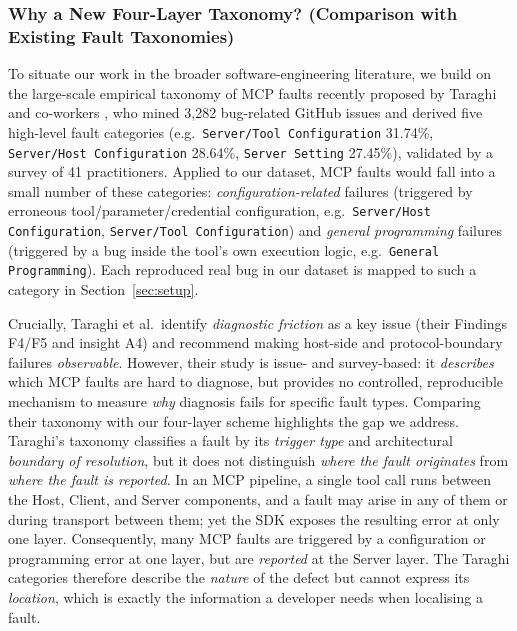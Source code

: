 \subsubsection{Why a New Four-Layer Taxonomy? (Comparison with Existing Fault Taxonomies)}

To situate our work in the broader software-engineering literature, we build on the large-scale
empirical taxonomy of MCP faults recently proposed by Taraghi and co-workers
\cite{taraghi2026real}, who mined 3,282 bug-related GitHub issues and derived five high-level
fault categories (e.g.\ \texttt{Server/Tool Configuration} 31.74\%, \texttt{Server/Host
Configuration} 28.64\%, \texttt{Server Setting} 27.45\%), validated by a survey of 41
practitioners. Applied to our dataset, MCP faults would fall into a small number of these
categories: \emph{configuration-related} failures (triggered by erroneous
tool/parameter/credential configuration, e.g.\ \texttt{Server/Host Configuration},
\texttt{Server/Tool Configuration}) and \emph{general programming} failures (triggered by a
bug inside the tool's own execution logic, e.g.\ \texttt{General Programming}). Each reproduced
real bug in our dataset is mapped to such a category in Section~\ref{sec:setup}.

Crucially, Taraghi et al.\ identify \emph{diagnostic friction} as a key issue (their Findings
F4/F5 and insight A4) and recommend making host-side and protocol-boundary failures
\emph{observable}. However, their study is issue- and survey-based: it \emph{describes} which MCP
faults are hard to diagnose, but provides no controlled, reproducible mechanism to measure
\emph{why} diagnosis fails for specific fault types. Comparing their taxonomy with our four-layer
scheme highlights the gap we address. Taraghi's taxonomy classifies a fault by its \emph{trigger
type} and architectural \emph{boundary of resolution}, but it does not distinguish \emph{where
the fault originates} from \emph{where the fault is reported}. In an MCP pipeline, a single tool
call runs between the Host, Client, and Server components, and a fault may arise in any of them
or during transport between them; yet the SDK exposes the resulting error at only one layer.
Consequently, many MCP faults are triggered by a configuration or
programming error at one layer, but are \emph{reported} at the Server layer. The Taraghi
categories therefore describe the \emph{nature} of the defect but cannot express its
\emph{location}, which is exactly the information a developer needs when localising a fault.

